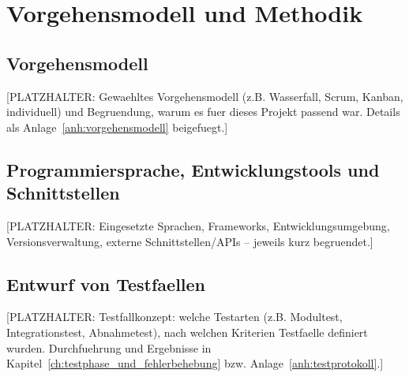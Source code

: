 \chapter{Vorgehensmodell und Methodik}
\label{ch:vorgehensmodell}

\section{Vorgehensmodell}
[PLATZHALTER: Gewaehltes Vorgehensmodell (z.B. Wasserfall, Scrum, Kanban,
individuell) und Begruendung, warum es fuer dieses Projekt passend war.
Details als Anlage~\ref{anh:vorgehensmodell} beigefuegt.]

\section{Programmiersprache, Entwicklungstools und Schnittstellen}
[PLATZHALTER: Eingesetzte Sprachen, Frameworks, Entwicklungsumgebung,
Versionsverwaltung, externe Schnittstellen/APIs -- jeweils kurz begruendet.]

\section{Entwurf von Testfaellen}
[PLATZHALTER: Testfallkonzept: welche Testarten (z.B. Modultest,
Integrationstest, Abnahmetest), nach welchen Kriterien Testfaelle definiert
wurden. Durchfuehrung und Ergebnisse in
Kapitel~\ref{ch:testphase_und_fehlerbehebung} bzw.
Anlage~\ref{anh:testprotokoll}.]
